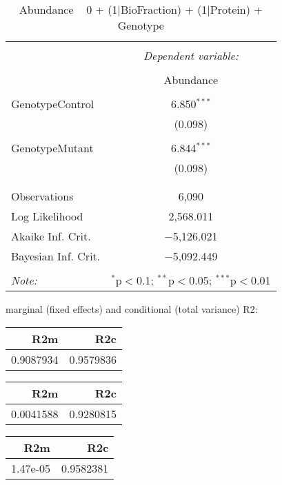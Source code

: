 \documentclass[11pt]{report}
\begin{document}
\begin{table}[!htbp] \centering 
  \caption{Abundance ~ 0 + (1|BioFraction) + (1|Protein) + Genotype} 
  \label{} 
\begin{tabular}{@{\extracolsep{5pt}}lc} 
\\[-1.8ex]\hline 
\hline \\[-1.8ex] 
 & \multicolumn{1}{c}{\textit{Dependent variable:}} \\ 
\cline{2-2} 
\\[-1.8ex] & Abundance \\ 
\hline \\[-1.8ex] 
 GenotypeControl & 6.850$^{***}$ \\ 
  & (0.098) \\ 
  & \\ 
 GenotypeMutant & 6.844$^{***}$ \\ 
  & (0.098) \\ 
  & \\ 
\hline \\[-1.8ex] 
Observations & 6,090 \\ 
Log Likelihood & 2,568.011 \\ 
Akaike Inf. Crit. & $-$5,126.021 \\ 
Bayesian Inf. Crit. & $-$5,092.449 \\ 
\hline 
\hline \\[-1.8ex] 
\textit{Note:}  & \multicolumn{1}{r}{$^{*}$p$<$0.1; $^{**}$p$<$0.05; $^{***}$p$<$0.01} \\ 
\end{tabular} 
\end{table} 
marginal (fixed effects) and conditional (total variance) R2:

\begin{tabular}{r|r}
\hline
R2m & R2c\\
\hline
0.9087934 & 0.9579836\\
\hline
\end{tabular}

\begin{tabular}{r|r}
\hline
R2m & R2c\\
\hline
0.0041588 & 0.9280815\\
\hline
\end{tabular}

\begin{tabular}{r|r}
\hline
R2m & R2c\\
\hline
1.47e-05 & 0.9582381\\
\hline
\end{tabular}
\end{document}
